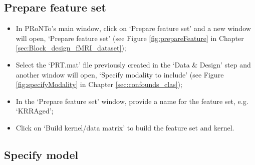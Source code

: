 
\subsection{Prepare feature set}

\begin{itemize}
	
	\item In PRoNTo's main window, click on `Prepare feature set' and a new window will open, `Prepare feature set' (see Figure \ref{fig:prepareFeature} in Chapter \ref{sec:Block_design_fMRI_dataset});
	\item Select the `PRT.mat' file previously created in the `Data \& Design' step and another window will open, `Specify modality to include' (see Figure \ref{fig:specifyModality} in Chapter \ref{sec:confounds_clas});

		
	\item In the `Prepare feature set' window, provide a name for the feature set, e.g. `KRRAged';

	\item Click on `Build kernel/data matrix' to build the feature set and kernel.

\end{itemize}




\subsection{Specify model}


